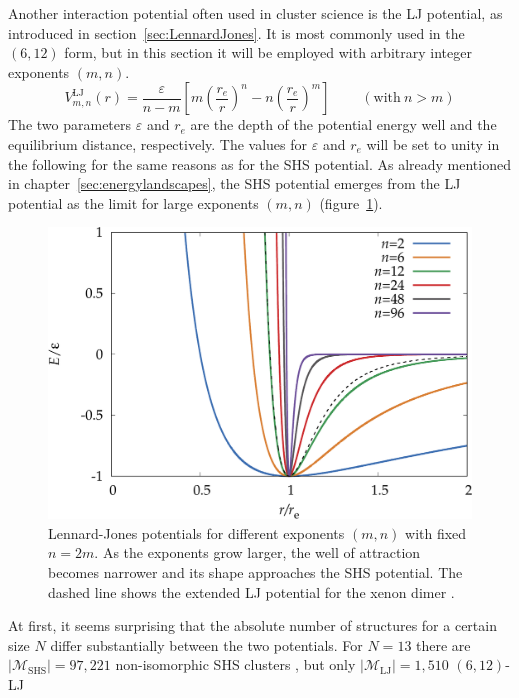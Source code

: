Another interaction potential often used in cluster science is the \acf{LJ}
potential, as introduced in section~\ref{sec:LennardJones}. It is most commonly
used in the $(6,12)$ form, but in this section it will be employed with
arbitrary integer exponents $(m,n)$.
%
\begin{equation}
    V_{m,n}^\mathrm{LJ}(r)=\frac{\varepsilon}{n-m}\left[m\left(\frac{r_e}{r}\right)^{n}-n\left(\frac{r_e}{r}\right)^{m}\right] \ \ \ \ \ \ \ \ \ \  (\mathrm{with}\ n > m)
\label{eqn:nmpot}
\end{equation}
%
The two parameters $\varepsilon$ and $r_e$ are the depth of the potential energy
well and the equilibrium distance, respectively. The values for $\varepsilon$
and $r_e$ will be set to unity in the following for the same reasons as for the
\ac{SHS} potential. As already mentioned in chapter~\ref{sec:energylandscapes},
the \ac{SHS} potential emerges from the \ac{LJ} potential as the limit for large
exponents $(m,n)$ (figure~\ref{fig:LJ}).
%
\begin{figure}[htb]\centering
    \includegraphics[width=0.8\columnwidth]{kslj/exampleLJ.pdf}
    \caption{Lennard-Jones potentials for different exponents $(m,n)$ with
    fixed $n=2m$. As the exponents grow larger, the well of attraction becomes narrower 
    and its shape approaches the \acs{SHS} potential. The dashed line
    shows the extended LJ potential for the xenon dimer \autocite{Jerabek_relativisticcoupledclusterinteraction_2017}.}
    \label{fig:LJ}
\end{figure}
%
At first, it seems surprising that the absolute number of structures for a
certain size $N$ differ substantially between the two potentials. For $N=13$
there are $|\mathcal{M}_\mathrm{SHS}|=97,221$ non-isomorphic \ac{SHS} clusters
\autocite{Hoy_Structuredynamicsmodel_2015,Holmes-Cerfon_EnumeratingRigidSphere_2016},
but only $|\mathcal{M}_\mathrm{LJ}|=1,510$ $(6,12)$-\ac{LJ}
